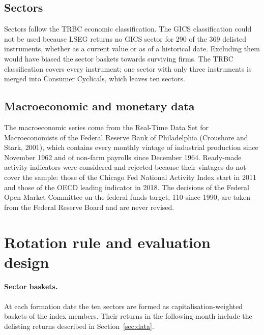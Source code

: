 \documentclass[11pt,a4paper]{article}
\begin{document}
\subsection{Sectors}

Sectors follow the TRBC economic classification. The GICS classification could not be used because LSEG returns no GICS sector for 290 of the 369 delisted instruments, whether as a current value or as of a historical date. Excluding them would have biased the sector baskets towards surviving firms. The TRBC classification covers every instrument; one sector with only three instruments is merged into Consumer Cyclicals, which leaves ten sectors.

\subsection{Macroeconomic and monetary data}

The macroeconomic series come from the Real-Time Data Set for Macroeconomists of the Federal Reserve Bank of Philadelphia (Croushore and Stark, 2001), which contains every monthly vintage of industrial production since November 1962 and of non-farm payrolls since December 1964. Ready-made activity indicators were considered and rejected because their vintages do not cover the sample: those of the Chicago Fed National Activity Index start in 2011 and those of the OECD leading indicator in 2018. The decisions of the Federal Open Market Committee on the federal funds target, 110 since 1990, are taken from the Federal Reserve Board and are never revised.

\section{Rotation rule and evaluation design}\label{sec:rule}

\paragraph{Sector baskets.} At each formation date the ten sectors are formed as capitalisation-weighted baskets of the index members. Their returns in the following month include the delisting returns described in Section~\ref{sec:data}.
\end{document}
